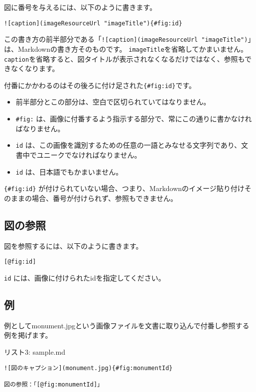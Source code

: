 図に番号を与えるには、以下のように書きます。

\begin{verbatim}
![caption](imageResourceUrl "imageTitle"){#fig:id} 
\end{verbatim}

この書き方の前半部分である「\texttt{!{[}caption{]}(imageResourceUrl\ "imageTitle")}」は、Markdownの書き方そのものです。
\texttt{imageTitle}を省略してかまいません。\texttt{caption}を省略すると、図タイトルが表示されなくなるだけではなく、参照もできなくなります。

付番にかかわるのはその後ろに付け足された\texttt{\{\#fig:id\}}です。

\begin{itemize}
\tightlist
\item
  前半部分とこの部分は、空白で区切られていてはなりません。
\item
  \texttt{\#fig:}
  は、画像に付番するよう指示する部分で、常にこの通りに書かなければなりません。
\item
  \texttt{id}
  は、この画像を識別するための任意の一語とみなせる文字列であり、文書中でユニークでなければなりません。
\item
  \texttt{id} は、日本語でもかまいません。
\end{itemize}

\texttt{\{\#fig:id\}}
が付けられていない場合、つまり、Markdownのイメージ貼り付けそのままの場合、番号が付けられず、参照もできません。

\subsection{図の参照}\label{ux56f3ux306eux53c2ux7167}

図を参照するには、以下のように書きます。

\begin{verbatim}
[@fig:id]
\end{verbatim}

\texttt{id} には、画像に付けられたidを指定してください。

\subsection{例}\label{ux4f8b}

例としてmonument.jpgという画像ファイルを文書に取り込んで付番し参照する例を掲げます。

リスト3: sample.md

\begin{verbatim}
![図のキャプション](monument.jpg){#fig:monumentId}

図の参照：「[@fig:monumentId]」
\end{verbatim}


